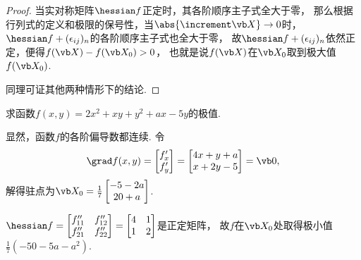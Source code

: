 \begin{theorem}
\begin{proof}
当实对称矩阵\(\hessian f\)正定时，其各阶顺序主子式全大于零，
那么根据行列式的定义和极限的保号性，当\(\abs{\increment\x}\to0\)时，
\(\hessian f + (\epsilon_{ij})_n\)的各阶顺序主子式也全大于零，
故\(\hessian f + (\epsilon_{ij})_n\)依然正定，便得\(f(\x) - f(\X0) > 0\)，
也就是说\(f(\x)\)在\(\X0\)取到极大值\(f(\X0)\).

同理可证其他两种情形下的结论.
\end{proof}
\end{theorem}

\begin{example}
求函数\(f(x,y) = 2x^2 + xy + y^2 + ax - 5y\)的极值.
\begin{solution}
显然，函数\(f\)的各阶偏导数都连续.
令\begin{equation*}
	\grad f(x,y) = \begin{bmatrix} f'_x \\ f'_y \end{bmatrix}
	= \begin{bmatrix} 4x+y+a \\ x+2y-5 \end{bmatrix} = \z,
\end{equation*}
解得驻点为\(\X0 = \frac{1}{7} \begin{bmatrix} -5-2a \\ 20+a \end{bmatrix}\).

\(\hessian f = \begin{bmatrix}
	f''_{11} & f''_{12} \\
	f''_{21} & f''_{22}
\end{bmatrix}
= \begin{bmatrix}
4 & 1 \\
1 & 2
\end{bmatrix}\)是正定矩阵，
故\(f\)在\(\X0\)处取得极小值\(\frac{1}{7} (-50-5a-a^2)\).
\end{solution}
\end{example}

